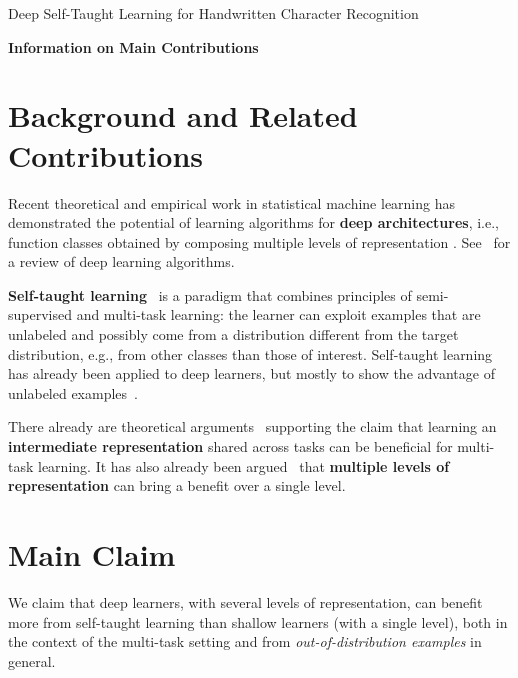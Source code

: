 \documentclass{article} %
\begin{document}
\begin{center}
{\Large Deep Self-Taught Learning for Handwritten Character Recognition}

{\bf \large Information on Main Contributions}
\end{center}

\setlength{\parindent}{0cm}

\section*{Background and Related Contributions}

Recent theoretical and empirical work in statistical machine learning has
demonstrated the potential of learning algorithms for {\bf deep
  architectures}, i.e., function classes obtained by composing multiple
levels of representation
\citep{Hinton06,ranzato-07-small,Bengio-nips-2006,VincentPLarochelleH2008,ranzato-08,Larochelle-jmlr-2009,Salakhutdinov+Hinton-2009,HonglakL2009,HonglakLNIPS2009,Jarrett-ICCV2009,Taylor-cvpr-2010}.
See~\citet{Bengio-2009} for a review of deep learning algorithms.

{\bf Self-taught learning}~\citep{RainaR2007} is a paradigm that combines
principles of semi-supervised and multi-task learning: the learner can
exploit examples that are unlabeled and possibly come from a distribution
different from the target distribution, e.g., from other classes than those
of interest.  Self-taught learning has already been applied to deep
learners, but mostly to show the advantage of unlabeled
examples~\citep{Bengio-2009,WestonJ2008-small}.

There already are theoretical arguments~\citep{baxter95a} supporting the claim
that learning an {\bf intermediate representation} shared across tasks can be
beneficial for multi-task learning. It has also already been argued~\citep{Bengio-2009}
that {\bf multiple levels of representation} can bring a benefit over a single level.

\section*{Main Claim}

We claim that deep learners, with several levels of representation, can
benefit more from self-taught learning than shallow learners (with a single
level), both in the context of the multi-task setting and from {\em
  out-of-distribution examples} in general.
\end{document}
